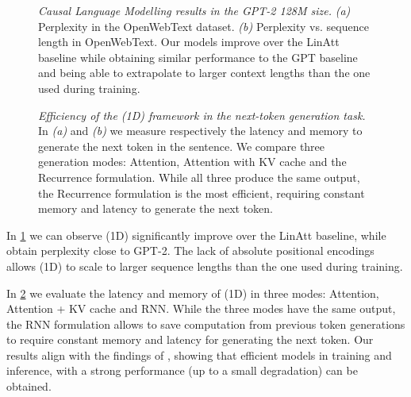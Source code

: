 \begin{figure}[h]
    \centering
    \caption{\textit{Causal Language Modelling results in the GPT-2 128M size.} \textit{(a)} Perplexity in the OpenWebText dataset. \textit{(b)} Perplexity vs. sequence length in OpenWebText. Our models improve over the LinAtt baseline \citep{trans_rnn} while obtaining similar performance to the GPT baseline and being able to extrapolate to larger context lengths than the one used during training.}
    \label{fig:owt}
\end{figure}

\begin{figure}
    \caption{\textit{Efficiency of the \lions(1D){} framework in the next-token generation task.} In \textit{(a)} and \textit{(b)} we measure respectively the latency and memory to generate the next token in the sentence. We compare three generation modes: Attention, Attention with KV cache and the Recurrence formulation. While all three produce the same output, the Recurrence formulation is the most efficient, requiring constant memory and latency to generate the next token.}
    \label{fig:memory_latency_LM}
\end{figure}

In \cref{fig:owt} we can observe \lions(1D){} significantly improve over the LinAtt baseline, while obtain perplexity close to GPT-2. The lack of absolute positional encodings allows \lions(1D){} to scale to larger sequence lengths than the one used during training. 

In \cref{fig:memory_latency_LM} we evaluate the latency and memory of \lions(1D){} in three modes: Attention, Attention + KV cache and RNN. While the three modes have the same output, the RNN formulation allows to save computation from previous token generations to require constant memory and latency for generating the next token. Our results align with the findings of \citet{retnet}, showing that efficient models in training and inference, with a strong performance (up to a small degradation) can be obtained.

